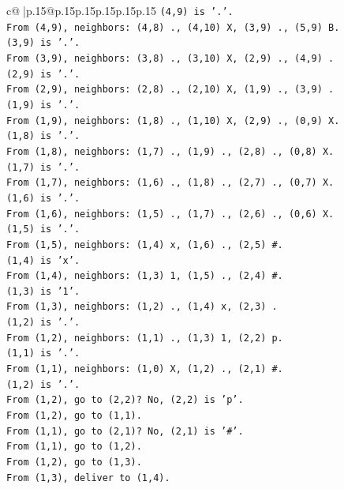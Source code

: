 \documentclass{article}
\begin{document}
{\begin{supertabular}{c@{$\;$}|p{.15\linewidth}@{}p{.15\linewidth}p{.15\linewidth}p{.15\linewidth}p{.15\linewidth}p{.15\linewidth}}
{{{\texttt{(4,9) is '.'.} \\
\texttt{From (4,9), neighbors: (4,8) ., (4,10) X, (3,9) ., (5,9) B.} \\
\texttt{(3,9) is '.'.} \\
\texttt{From (3,9), neighbors: (3,8) ., (3,10) X, (2,9) ., (4,9) .} \\
\texttt{(2,9) is '.'.} \\
\texttt{From (2,9), neighbors: (2,8) ., (2,10) X, (1,9) ., (3,9) .} \\
\texttt{(1,9) is '.'.} \\
\texttt{From (1,9), neighbors: (1,8) ., (1,10) X, (2,9) ., (0,9) X.} \\
\texttt{(1,8) is '.'.} \\
\texttt{From (1,8), neighbors: (1,7) ., (1,9) ., (2,8) ., (0,8) X.} \\
\texttt{(1,7) is '.'.} \\
\texttt{From (1,7), neighbors: (1,6) ., (1,8) ., (2,7) ., (0,7) X.} \\
\texttt{(1,6) is '.'.} \\
\texttt{From (1,6), neighbors: (1,5) ., (1,7) ., (2,6) ., (0,6) X.} \\
\texttt{(1,5) is '.'.} \\
\texttt{From (1,5), neighbors: (1,4) x, (1,6) ., (2,5) \#.} \\
\texttt{(1,4) is 'x'.} \\
\texttt{From (1,4), neighbors: (1,3) 1, (1,5) ., (2,4) \#.} \\
\texttt{(1,3) is '1'.} \\
\texttt{From (1,3), neighbors: (1,2) ., (1,4) x, (2,3) .} \\
\texttt{(1,2) is '.'.} \\
\texttt{From (1,2), neighbors: (1,1) ., (1,3) 1, (2,2) p.} \\
\texttt{(1,1) is '.'.} \\
\texttt{From (1,1), neighbors: (1,0) X, (1,2) ., (2,1) \#.} \\
\texttt{(1,2) is '.'.} \\
\texttt{From (1,2), go to (2,2)? No, (2,2) is 'p'.} \\
\texttt{From (1,2), go to (1,1).} \\
\texttt{From (1,1), go to (2,1)? No, (2,1) is '\#'.} \\
\texttt{From (1,1), go to (1,2).} \\
\texttt{From (1,2), go to (1,3).} \\
\texttt{From (1,3), deliver to (1,4).} \\
}}}
\end{supertabular}}
\end{document}
